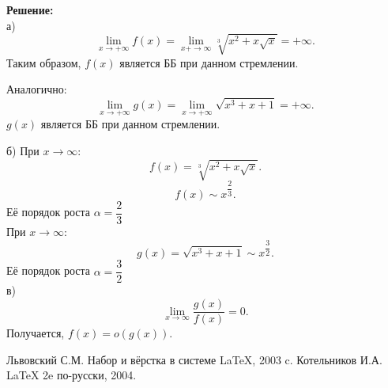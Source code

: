 \documentclass[12pt]{article}
\begin{document}
\textbf{Решение:}\\
а)
$$\lim\limits_{x\rightarrow +\infty} f(x) = \lim\limits_{x+\rightarrow \infty}\sqrt[3]{x^2+x\sqrt{x}}=+\infty .$$ 
Таким образом, $f(x)$ является ББ при данном стремлении.

Аналогично:
$$\lim\limits_{x\rightarrow +\infty} g(x) = \lim\limits_{x\rightarrow +\infty}\sqrt{x^3+x+1}=+\infty.$$
 $g(x)$ является ББ при данном стремлении.
 
б) При $ x\rightarrow\infty$:
$$ f(x)=\sqrt[3]{x^2+x\sqrt{x}}.$$
$$f(x)\sim x^{\dfrac{2}{3}}. $$
Её порядок роста $\alpha=\dfrac{2}{3} $\\
 При $ x\rightarrow\infty$:
$$ g(x) = \sqrt{x^3+x+1} \sim  {x^{\dfrac{3}{2}}}.$$
Её порядок роста $\alpha=\dfrac{3}{2} $\\
в)
$$\lim\limits_{x\rightarrow \infty} \frac{g(x)}{f(x)} = 0.$$ 
Получается, $f(x) = o(g(x))$.
\newpage
{}
\begin{thebibliography}{99}
 Львовский С.М. Набор и вёрстка в системе \LaTeX, 2003 c.
 Котельников И.А. \LaTeX \; 2e по-русски, 2004.
\end{thebibliography}
\end{document}
